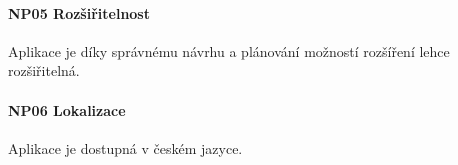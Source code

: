 \noindent \begin{minipage}{\textwidth}
    \paragraph{NP05 Rozšiřitelnost}
    \begin{smallindent}{}
        Aplikace je díky správnému návrhu a plánování možností rozšíření lehce rozšiřitelná.
    \end{smallindent}
\end{minipage}

\noindent \begin{minipage}{\textwidth}
    \paragraph{NP06 Lokalizace}
    \begin{smallindent}{}
        Aplikace je dostupná v českém jazyce.
    \end{smallindent}
\end{minipage}

